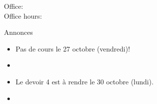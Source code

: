 \documentclass{beamer}
\subtitle[Comparatifs et superlatifs]{Les comparatifs et les superlatifs}
\begin{document}
  \begin{frame}
    \titlepage
    \tiny{Office: \\
          Office hours: }
  \end{frame}

  \begin{frame}{Annonces}
    \begin{itemize}
      \item Pas de cours le 27 octobre (vendredi)!
      \item[] 
      \item Le devoir 4 est à rendre le 30 octobre (lundi).
      \item[] 
    \end{itemize}
  \end{frame}

\end{document}
